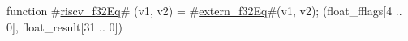 function #\hyperref[sailRISCVzriscvzyf32Eq]{riscv\_f32Eq}# (v1, v2) = {
  #\hyperref[sailRISCVzexternzyf32Eq]{extern\_f32Eq}#(v1, v2);
  (float_fflags[4 .. 0], float_result[31 .. 0])
}
